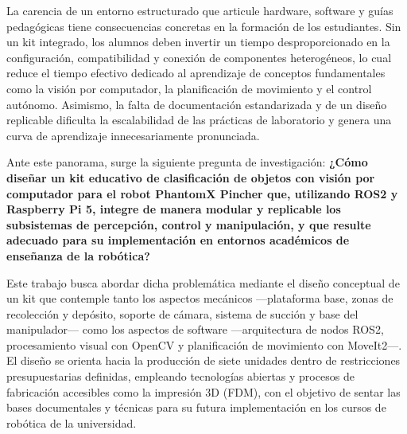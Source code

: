 La carencia de un entorno estructurado que articule hardware, software y guías pedagógicas tiene consecuencias concretas en la formación de los estudiantes. Sin un kit integrado, los alumnos deben invertir un tiempo desproporcionado en la configuración, compatibilidad y conexión de componentes heterogéneos, lo cual reduce el tiempo efectivo dedicado al aprendizaje de conceptos fundamentales como la visión por computador, la planificación de movimiento y el control autónomo. Asimismo, la falta de documentación estandarizada y de un diseño replicable dificulta la escalabilidad de las prácticas de laboratorio y genera una curva de aprendizaje innecesariamente pronunciada.

Ante este panorama, surge la siguiente pregunta de investigación: \textbf{¿Cómo diseñar un kit educativo de clasificación de objetos con visión por computador para el robot PhantomX Pincher que, utilizando ROS2 y Raspberry Pi 5, integre de manera modular y replicable los subsistemas de percepción, control y manipulación, y que resulte adecuado para su implementación en entornos académicos de enseñanza de la robótica?}

Este trabajo busca abordar dicha problemática mediante el diseño conceptual de un kit que contemple tanto los aspectos mecánicos ---plataforma base, zonas de recolección y depósito, soporte de cámara, sistema de succión y base del manipulador--- como los aspectos de software ---arquitectura de nodos ROS2, procesamiento visual con OpenCV y planificación de movimiento con MoveIt2---. El diseño se orienta hacia la producción de siete unidades dentro de restricciones presupuestarias definidas, empleando tecnologías abiertas y procesos de fabricación accesibles como la impresión 3D (FDM), con el objetivo de sentar las bases documentales y técnicas para su futura implementación en los cursos de robótica de la universidad.